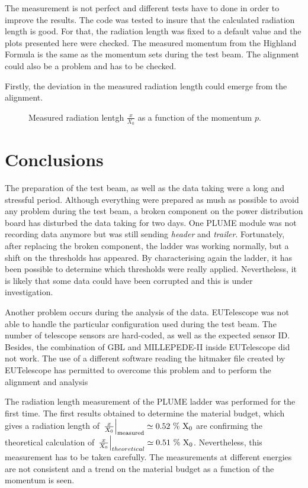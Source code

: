    The measurement is not perfect and different tests have to done in order to improve the results.
   The code was tested to insure that the calculated radiation length is good.
   For that, the radiation length was fixed to a default value and the plots presented here were checked.
   The measured momentum from the Highland Formula is the same as the momentum sets during the test beam.
   The alignment could also be a problem and has to be checked.

   Firstly, the deviation in the measured radiation length could emerge from the alignment.
  
   \begin{figure}
     \centering
     \caption{Measured radiation lentgh $\frac{x}{X_0}$ as a function of the momentum $p$.}
     \label{fig:X0vsP}
   \end{figure}


  \section{Conclusions}

  The preparation of the test beam, as well as the data taking were a long and stressful period.
  Although everything were prepared as mush as possible to avoid any problem during the test beam, a broken component on the power distribution board has disturbed the data taking for two days.
  One \gls{PLUME} module was not recording data anymore but was still sending \textit{header} and \textit{trailer}.
  Fortunately, after replacing the broken component, the ladder was working normally, but a shift on the thresholds has appeared.
  By characterising again the ladder, it has been possible to determine which thresholds were really applied. 
  Nevertheless, it is likely that some data could have been corrupted and this is under investigation.

  Another problem occurs during the analysis of the data. 
  EUTelescope was not able to handle the particular configuration used during the test beam.
  The number of telescope sensors are hard-coded, as well as the expected sensor ID.
  Besides, the combination of \gls{GBL} and MILLEPEDE-II inside EUTelescope did not work.
  The use of a different software reading the hitmaker file created by EUTelescope has permitted to overcome this problem and to perform the alignment and analysis 

  The radiation length measurement of the \gls{PLUME} ladder was performed for the first time.
  The first results obtained to determine the material budget, which gives a radiation length of $\left. \frac{x}{X_0} \right|_{\rm{measured}} \simeq 0.52~\%~\rm{X_0}$ are confirming the theoretical calculation of $\left. \frac{x}{X_0}\right|_{theoretical} \simeq 0.51~\%~\rm{X_0}$.
  Nevertheless, this measurement has to be taken carefully. 
  The measurements at different energies are not consistent and a trend on the material budget as a function of the momentum is seen.

